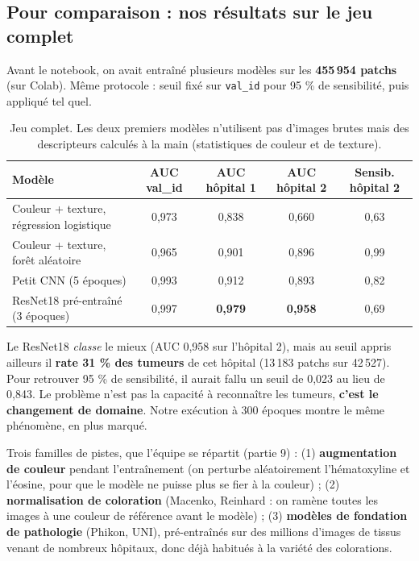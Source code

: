 \documentclass[11pt,a4paper]{article}
\begin{document}
\subsection{Pour comparaison : nos résultats sur le jeu complet}
Avant le notebook, on avait entraîné plusieurs modèles sur les \textbf{455\,954 patchs} (sur Colab). Même
protocole : seuil fixé sur \texttt{val\_id} pour 95 \% de sensibilité, puis appliqué tel quel.

\begin{table}[H]
\centering
\small
\begin{tabular}{lcccc}
\toprule
\textbf{Modèle} & \textbf{AUC val\_id} & \textbf{AUC hôpital 1} & \textbf{AUC hôpital 2} & \textbf{Sensib. hôpital 2} \\
\midrule
Couleur + texture, régression logistique & 0,973 & 0,838 & 0,660 & 0,63 \\
Couleur + texture, forêt aléatoire & 0,965 & 0,901 & 0,896 & 0,99 \\
Petit CNN (5 époques) & 0,993 & 0,912 & 0,893 & 0,82 \\
ResNet18 pré-entraîné (3 époques) & 0,997 & \textbf{0,979} & \textbf{0,958} & 0,69 \\
\bottomrule
\end{tabular}
\caption{Jeu complet. Les deux premiers modèles n'utilisent pas d'images brutes mais des descripteurs calculés
à la main (statistiques de couleur et de texture).}
\end{table}

\begin{constat}
Le ResNet18 \emph{classe} le mieux (AUC 0,958 sur l'hôpital 2), mais au seuil appris ailleurs il
\textbf{rate 31 \% des tumeurs} de cet hôpital (13\,183 patchs sur 42\,527). Pour retrouver 95 \% de
sensibilité, il aurait fallu un seuil de 0,023 au lieu de 0,843. Le problème n'est pas la capacité à
reconnaître les tumeurs, \textbf{c'est le changement de domaine}. Notre exécution à 300 époques montre le
même phénomène, en plus marqué.
\end{constat}

\begin{oral}
Trois familles de pistes, que l'équipe se répartit (partie 9) :
(1) \textbf{augmentation de couleur} pendant l'entraînement (on perturbe aléatoirement l'hématoxyline et
l'éosine, pour que le modèle ne puisse plus se fier à la couleur) ;
(2) \textbf{normalisation de coloration} (Macenko, Reinhard : on ramène toutes les images à une couleur de
référence avant le modèle) ;
(3) \textbf{modèles de fondation de pathologie} (Phikon, UNI), pré-entraînés sur des millions d'images de
tissus venant de nombreux hôpitaux, donc déjà habitués à la variété des colorations.
\end{oral}
\end{document}
